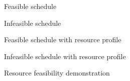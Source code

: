 \documentclass{article}
\begin{document}
\begin{figure}[ht]
	\centering
	
	\caption{Feasible schedule}
	\label{fig:activity_graph}
\end{figure}

\begin{figure}[ht]
	\centering
	
	\caption{Infeasible schedule}
	\label{fig:activity_graph}
\end{figure}

\begin{figure}[ht]
	\centering
	
	\caption{Feasible schedule with resource profile}
	\label{fig:activity_graph}
\end{figure}

\begin{figure}[ht]
	\centering
	
	\caption{Infeasible schedule with resource profile}
	\label{fig:activity_graph}
\end{figure}

\begin{figure}[ht]
	\centering
	\makebox[\textwidth][c]{
		
	}
	\caption{Resource feasibility demonstration}
	\label{fig:activity_graph}
\end{figure}
\end{document}
